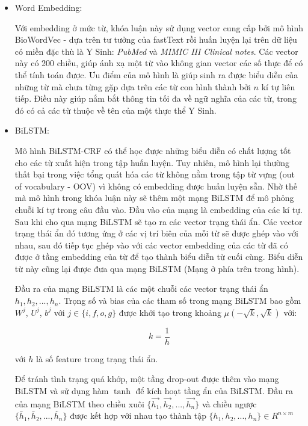 \documentclass[../main.tex]{subfiles}
\begin{document}
\begin{itemize}

\item Word Embedding: 

Với embedding ở mức từ, khóa luận này sử dụng vector cung cấp bởi mô hình BioWordVec - dựa trên tư tưởng của fastText rồi huấn luyện lại trên dữ liệu có miền đặc thù là Y Sinh: \textit{PubMed} và \textit{MIMIC III Clinical notes}. Các vector này có 200 chiều, giúp ánh xạ một từ vào không gian vector các số thực để có thể tính toán được. Ưu điểm của mô hình là giúp sinh ra được biểu diễn của những từ mà chưa từng gặp dựa trên các từ con hình thành bởi $n$ kí tự liên tiếp. Điều này giúp nắm bắt thông tin tối đa về ngữ nghĩa của các từ, trong đó có cả các từ thuộc về tên của một thực thể Y Sinh. 

\item BiLSTM:


Mô hình BiLSTM-CRF có thể học được những biểu diễn có chất lượng tốt cho các từ xuất hiện trong tập huấn luyện. Tuy nhiên, mô hình lại thường thất bại trong việc tổng quát hóa các từ không nằm trong tập từ vựng (out of vocabulary - OOV) vì không có embedding được huấn luyện sẵn. Nhờ thế mà mô hình trong khóa luận này sẽ thêm một mạng BiLSTM để mô phỏng chuỗi kí tự trong câu đầu vào. Đầu vào của mạng là embedding của các kí tự. Sau khi cho qua mạng BiLSTM sẽ tạo ra các vector trạng thái ẩn. Các vector trạng thái ẩn đó tương ứng ở các vị trí biên của mỗi từ sẽ được ghép vào với nhau, sau đó tiếp tục ghép vào với các vector embedding của các từ đã có được ở tầng embedding của từ để tạo thành biểu diễn từ cuối cùng. Biểu diễn từ này cũng lại được đưa qua mạng BiLSTM (Mạng ở phía trên trong hình). 

Đầu ra của mạng BiLSTM là các một chuỗi các vector trạng thái ẩn $h_{1}, h_{2}, ..., h_{n}$. Trọng số và bias của các tham số trong mạng BiLSTM bao gồm $W^{j}$, $U^{j}$, $b^{j}$ với $j \in \{i, f, o, g\}$ được khởi tạo trong khoảng $\mu(-\sqrt{k}, \sqrt{k})$ với:

\begin{equation}
k = \frac{1}{h} \nonumber
\end{equation}

với $h$ là số feature trong trạng thái ẩn. 

Để tránh tình trạng quá khớp, một tầng drop-out được thêm vào mạng BiLSTM và sử dụng hàm $\tanh$ để kích hoạt tầng ẩn của BiLSTM. Đầu ra của mạng BiLSTM theo chiều xuôi $\{\overrightarrow{h_{1}}, \overrightarrow{h_{2}}, ..., \overrightarrow{h_{n}}\}$ và chiều ngược $\{\overleftarrow{h_{1}}, \overleftarrow{h_{2}}, ..., \overleftarrow{h_{n}}\}$ được kết hợp với nhau tạo thành tập $\{h_{1}, h_{2}, ..., h_{n}\} \in R^{n \times m}$


\end{itemize}
\end{document}
